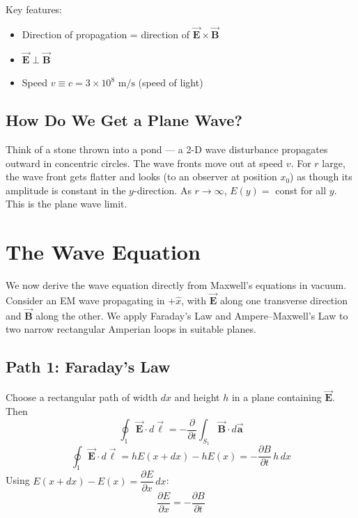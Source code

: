 \documentclass[11pt]{report}
\newcommand{\vbf}[1]{\vec{\mathbf{#1}}}
\begin{document}
Key features:
\begin{itemize}
    \item Direction of propagation = direction of $\vbf{E}\times\vbf{B}$
    \item $\vbf{E}\perp\vbf{B}$
    \item Speed $v \equiv c = 3\times 10^8\text{ m/s}$ (speed of light)
\end{itemize}

\subsection*{How Do We Get a Plane Wave?}

Think of a stone thrown into a pond --- a 2-D wave disturbance propagates outward in concentric circles. The wave fronts move out at speed $v$. For $r$ large, the wave front gets flatter and looks (to an observer at position $x_0$) as though its amplitude is constant in the $y$-direction. As $r\to\infty$, $E(y) = $ const for all $y$. This is the plane wave limit.

\section{The Wave Equation}
\label{sec:wave-eq}

We now derive the wave equation directly from Maxwell's equations in vacuum. Consider an EM wave propagating in $+\hat{x}$, with $\vbf{E}$ along one transverse direction and $\vbf{B}$ along the other. We apply Faraday's Law and Ampere--Maxwell's Law to two narrow rectangular Amperian loops in suitable planes.

\subsection*{Path 1: Faraday's Law}

Choose a rectangular path of width $dx$ and height $h$ in a plane containing $\vbf{E}$. Then
\begin{equation}
\oint_1 \vbf{E}\cdot d\vbf{\ell} = -\frac{\partial}{\partial t}\int_{S_1}\vbf{B}\cdot d\vbf{a}
\end{equation}
\begin{equation}
\oint_1 \vbf{E}\cdot d\vbf{\ell} = h E(x+dx) - h E(x) = -\frac{\partial B}{\partial t}\,h\,dx
\end{equation}
Using $E(x+dx) - E(x) = \dfrac{\partial E}{\partial x}\,dx$:
\begin{equation}
\boxed{\frac{\partial E}{\partial x} = -\frac{\partial B}{\partial t}}
\end{equation}
\end{document}
